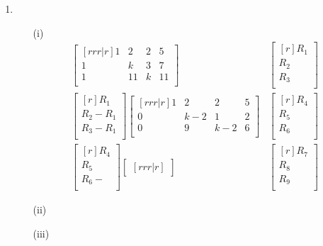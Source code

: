 \documentclass{report}
\theoremstyle{plain}
\theoremstyle{definition}
\theoremstyle{plain}
\begin{document}
\begin{enumerate}
\begin{enumerate}
\begin{enumerate}
		\end{enumerate}	
		\medskip
	\item
	\medskip
		\begin{enumerate}
		\item [(i)]
		\begin{align*}
		\begin{bmatrix}[rrr|r]
		1 & 2 & 2 & 5\\
		1 & k & 3 & 7\\
		1 & 11 & k & 11\\
		\end{bmatrix}&
		\begin{bmatrix}[r]
		R_1\\ R_2\\ R_3\\
		\end{bmatrix}\\
		\begin{bmatrix}[r]
		R_1\\
		R_2 - R_1\\
		R_3 - R_1\\
		\end{bmatrix}
		\begin{bmatrix}[rrr|r]
		1 & 2 & 2 & 5\\
		0 & k-2 & 1 & 2\\
		0 & 9 & k-2 & 6\\
		\end{bmatrix}&
		\begin{bmatrix}[r]
		R_4\\ R_5\\ R_6\\
		\end{bmatrix}\\
		\begin{bmatrix}[r]
		R_4\\
		R_5\\
		R_6 - \\
		\end{bmatrix}
		\begin{bmatrix}[rrr|r]
		\end{bmatrix}&
		\begin{bmatrix}[r]
		R_7\\ R_8\\ R_9\\
		\end{bmatrix}
		\end{align*}
		\item [(ii)]
		\item [(iii)]
		\end{enumerate}
	\end{enumerate}
\medskip

\end{enumerate}
\end{document}
